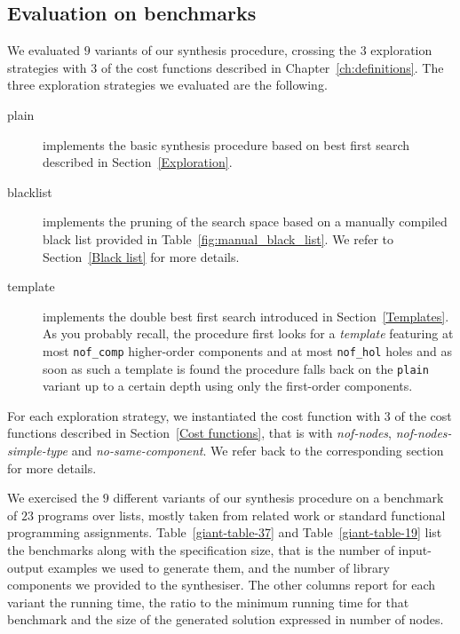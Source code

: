 \subsection{Evaluation on benchmarks}\label{Evaluation on benchmarks}
We evaluated $9$ variants of our synthesis procedure, crossing the $3$ exploration strategies with $3$ of the cost functions described in Chapter~\ref{ch:definitions}. The three exploration strategies we evaluated are the following.
\begin{description}
\item[plain] implements the basic synthesis procedure based on best first search described in Section~\ref{Exploration}.
\item[blacklist] implements the pruning of the search space based on a manually compiled black list provided in Table~\ref{fig:manual_black_list}. We refer to Section~\ref{Black list} for more details.
\item[template] implements the double best first search introduced in Section~\ref{Templates}. As you probably recall, the procedure first looks for a \emph{template} featuring at most \lstinline?nof_comp? higher-order components and at most \lstinline?nof_hol? holes and as soon as such a template is found the procedure falls back on the \lstinline?plain? variant up to a certain depth using only the first-order components.
\end{description}
For each exploration strategy, we instantiated the cost function with $3$ of the cost functions described in Section~\ref{Cost functions}, that is with \textit{nof-nodes}, \textit{nof-nodes-simple-type} and \textit{no-same-component}. We refer back to the corresponding section for more details.

We exercised the $9$ different variants of our synthesis procedure on a benchmark of $23$ programs over lists, mostly taken from related work or standard functional programming assignments. Table~\ref{giant-table-37} and Table~\ref{giant-table-19} list the benchmarks along with the specification size, that is the number of input-output examples we used to generate them, and the number of library components we provided to the synthesiser. The other columns report for each variant the running time, the ratio to the minimum running time for that benchmark and the size of the generated solution expressed in number of nodes.

